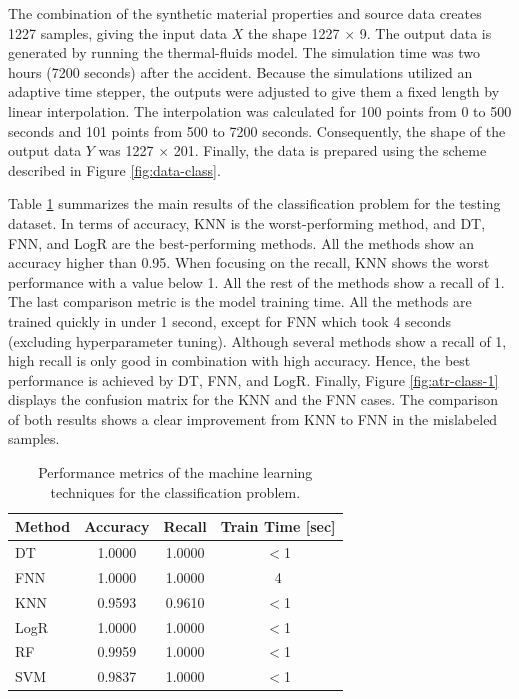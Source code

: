 The combination of the synthetic material properties and source data creates 1227 samples, giving the input data $X$ the shape 1227 $\times$ 9.
The output data is generated by running the thermal-fluids model.
The simulation time was two hours (7200 seconds) after the accident.
Because the simulations utilized an adaptive time stepper, the outputs were adjusted to give them a fixed length by linear interpolation.
The interpolation was calculated for 100 points from 0 to 500 seconds and 101 points from 500 to 7200 seconds.
Consequently, the shape of the output data $Y$ was 1227 $\times$ 201.
Finally, the data is prepared using the scheme described in Figure \ref{fig:data-class}.

Table \ref{tab:results-atr} summarizes the main results of the classification problem for the testing dataset.
In terms of accuracy, KNN is the worst-performing method, and DT, FNN, and LogR are the best-performing methods.
All the methods show an accuracy higher than 0.95.
When focusing on the recall, KNN shows the worst performance with a value below 1.
All the rest of the methods show a recall of 1.
The last comparison metric is the model training time.
All the methods are trained quickly in under 1 second, except for FNN which took 4 seconds (excluding hyperparameter tuning).
Although several methods show a recall of 1, high recall is only good in combination with high accuracy.
Hence, the best performance is achieved by DT, FNN, and LogR.
Finally, Figure \ref{fig:atr-class-1} displays the confusion matrix for the KNN and the FNN cases.
The comparison of both results shows a clear improvement from KNN to FNN in the mislabeled samples.

\begin{table}[htbp!]
  \centering
  \caption{Performance metrics of the machine learning techniques for the classification problem.}
  \label{tab:results-atr}
  \begin{tabular}{lccc}
    \toprule
    Method & Accuracy & Recall & Train Time [sec] \\
    \midrule
    DT      & 1.0000 & 1.0000 & $<$1 \\
    FNN     & 1.0000 & 1.0000 & 4 \\
    KNN     & 0.9593 & 0.9610 & $<$1 \\
    LogR    & 1.0000 & 1.0000 & $<$1 \\
    RF      & 0.9959 & 1.0000 & $<$1 \\
    SVM     & 0.9837 & 1.0000 & $<$1 \\
    \bottomrule
  \end{tabular}
\end{table}

